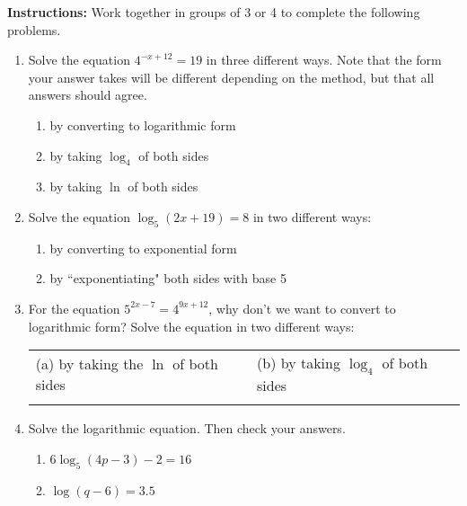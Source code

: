 



\noindent \textbf{Instructions:}  Work together in groups of  3 or 4 to complete the following problems.\\


\begin{enumerate}
\item Solve the equation $\displaystyle 4^{-x+12}=19$ in three different ways.  Note that the form your answer takes will be different depending on the method, but that all answers should agree.
\begin{enumerate}
\item by converting to logarithmic form \vfill
\item by taking $\displaystyle \log_4$ of both sides\vfill
\item by taking $\ln$ of both sides\vfill
\end{enumerate}

\clearpage
\item Solve the equation $\log_5(2x+19)=8$ in two different ways:
\begin{enumerate}
\item by converting to exponential form\\[1in]
\item by ``exponentiating" both sides with base 5\\[1in]
\end{enumerate}



\item For the equation $5^{2x-7}=4^{9x+12}$, why don't we want to convert to logarithmic form? Solve the equation in two different ways:


\begin{tabular}{p{} | p{}} 
(a) by taking the $\ln$ of both sides\hspace{1in} & (b) by taking $\log_4$ of both sides\\
& \rule{0cm}{0.5\textheight}  \\ 
\end{tabular} 

\vfill

\clearpage

\item Solve the logarithmic equation.  Then check your answers.
\begin{enumerate}
\item $6\log_5(4p-3)-2=16$\vfill
\item $\log(q-6)=3.5$\vfill


\end{enumerate}
\end{enumerate}
